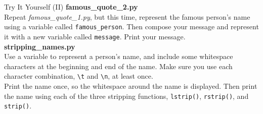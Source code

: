 \documentclass[aspectratio=169]{beamer}
\begin{document}
\begin{frame}[fragile]{Try It Yourself (II)}
    \textbf{famous\_quote\_2.py} \\
    Repeat \textit{famous\_quote\_1.py}, but this time, represent the famous person’s name using a variable called \texttt{famous\_person}.
    Then compose your message and represent it with a new variable called \texttt{message}.
    Print your message. \\
    \vspace{10pt}
    \textbf{stripping\_names.py} \\
    Use a variable to represent a person’s name, and include some whitespace characters at the beginning and end of the name.
    Make sure you use each character combination, \verb|\t| and \verb|\n|, at least once. \\
    \vspace{5pt}
    Print the name once, so the whitespace around the name is displayed. Then print the name using each of the three stripping functions, \texttt{lstrip()}, \texttt{rstrip()}, and \texttt{strip()}.
\end{frame}
\end{document}
